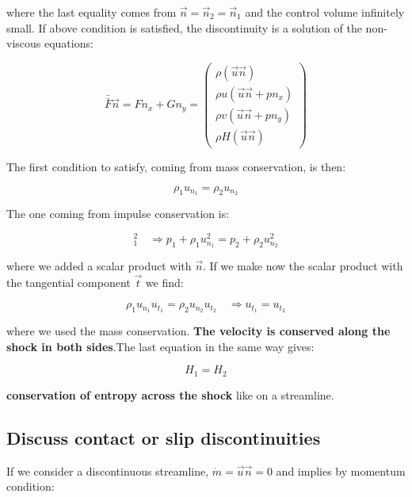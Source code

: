 \documentclass[british,french,11pt, a4paper, openany]{article}
\begin{document}
where the last equality comes from $\vec{n} = \vec{n}_2 = \vec{n}_1$ and the control volume infinitely small. If above condition is satisfied, the discontinuity is a solution of the non-viscous equations: 

\begin{equation}
\bar{\bar{F}}\vec{n} = F n_x + Gn_y = \left( \begin{array}{c}
\rho (\vec{u}\vec{n})\\
\rho u (\vec{u} \vec{n} + pn_x)\\
\rho v (\vec{u} \vec{n} + pn_y)\\
\rho H (\vec{u}\vec{n})	
\end{array}
\right)
\end{equation}

The first condition to satisfy, coming from mass conservation, is then: 

\begin{equation}
\rho _1 u_{n_1} = \rho _2 u_{n_2}
\end{equation}

The one coming from impulse conservation is: 

\begin{equation}
[\rho \vec{u}(\vec{u}\vec{n})+p\vec{n}]^2_1 \quad \Rightarrow p_1 + \rho _1 u_{n_1}^2 = p_2 + \rho _2 u_{n_2}^2
\end{equation}

where we added a scalar product with $\vec{n}$. If we make now the scalar product with the tangential component $\vec{t}$ we find: 

\begin{equation}
\rho _1 u_{n_1} u_{t_1} = \rho _2 u_{n_2} u_{t_2}\quad \Rightarrow u_{t_1} =u_{t_2}
\end{equation}

where we used the mass conservation. \textbf{The velocity is conserved along the shock in both sides}.The last equation in the same way gives: 

\begin{equation}
H_1 = H_2
\end{equation}

\textbf{conservation of entropy across the shock} like on a streamline. 

\subsection{Discuss contact or slip discontinuities}
If we consider a discontinuous streamline, $\dot{m} = \vec{u}\vec{n} = 0$ and implies by momentum condition: 
\end{document}
